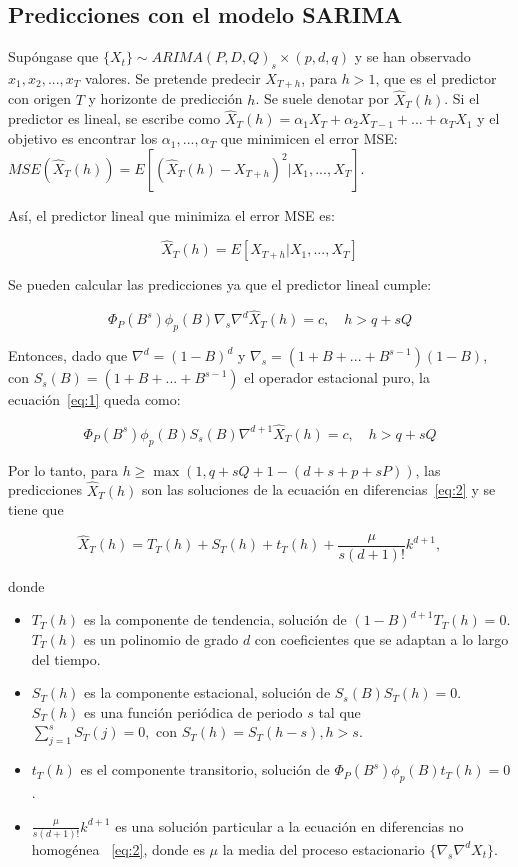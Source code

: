 \documentclass[12pt,twoside]{article}
\begin{document}
\subsection{Predicciones con el modelo SARIMA}\label{sec:35}
Supóngase que $\{X_t\}\sim ARIMA(P,D,Q)_s \times (p,d,q)$ y se han observado $x_1, x_2, ..., x_T$ valores. Se pretende predecir $X_{T+h}$, para $h>1$, que es el predictor con origen $T$ y horizonte de predicción $h$. Se suele denotar por $\hat{X}_T(h)$. Si el predictor es lineal, se escribe como $\hat{X}_T(h) = \alpha_1X_T+\alpha_2X_{T-1}+...+\alpha_TX_1$ y el objetivo es encontrar los $\alpha_1,...,\alpha_T$ que minimicen el error MSE: $MSE(\hat{X}_T(h))=E[(\hat{X}_T(h)-X_{T+h})^2|X_1,...,X_T]$.

Así, el predictor lineal que minimiza el error MSE es:

\begin{equation}
\hat{X}_T(h) = E[X_{T+h}|X_1,...,X_T] 
\end{equation}

Se pueden calcular las predicciones ya que el predictor lineal cumple:

\begin{equation}
\label{eq:1}
\Phi_P(B^s)\phi_p(B)\nabla_s \nabla^d \hat{X}_T(h) = c, \quad h > q + sQ
\end{equation}

Entonces, dado que $\nabla^d=(1-B)^d$ y $\nabla_s=(1+B+...+B^{s-1})(1-B)$, con $S_s(B)=(1+B+...+B^{s-1})$ el operador estacional puro, la ecuación~\ref{eq:1} queda como:

\begin{equation}
\label{eq:2}
\Phi_P(B^s)\phi_p(B)S_s(B)\nabla^{d+1} \hat{X}_T(h) = c, \quad h > q + sQ
\end{equation}

Por lo tanto, para $h \geq \max(1, q + sQ + 1 - (d + s + p + sP))$, las predicciones $\hat{X}_T(h)$ son las soluciones de la ecuación en diferencias~\ref{eq:2} y se tiene que

\begin{equation}
\hat{X}_T(h) = T_T(h) + S_T(h) + t_T(h) + \frac{\mu}{s(d+1)!}k^{d+1},
\end{equation}

donde

\begin{itemize}
    \item $T_T(h)$ es la componente de tendencia, solución de $(1-B)^{d+1}T_T(h)=0$. $T_T(h)$ es un polinomio de grado $d$ con coeficientes que se adaptan a lo largo del tiempo.
    \item $S_T(h)$ es la componente estacional, solución de $S_ s(B)S_T(h)=0$. $S_T(h)$ es una función periódica de periodo $s$ tal que $\sum_{j=1}^sS_T(j)=0, \text{ con } S_T(h)=S_T(h-s), h>s$.
    \item $t_T(h)$ es el componente transitorio, solución de $\Phi_P(B^s)\phi_p(B)t_T(h)=0$.
    \item $\frac{\mu}{s(d+1)!}k^{d+1}$ es una solución particular a la ecuación en diferencias no homogénea ~\ref{eq:2}, donde es $\mu$ la media del proceso estacionario $\{\nabla_s\nabla^dX_t\}$.
\end{itemize}
\end{document}
